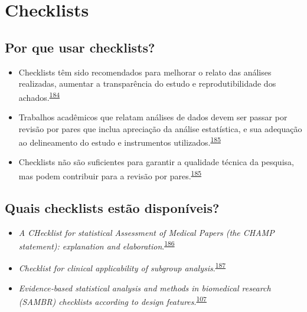 \documentclass[
]{book}
\begin{document}
\hypertarget{checklists}{%
\section{Checklists}\label{checklists}}

\hypertarget{por-que-usar-checklists}{%
\subsection{Por que usar checklists?}\label{por-que-usar-checklists}}

\begin{itemize}
\item
  Checklists têm sido recomendados para melhorar o relato das análises realizadas, aumentar a transparência do estudo e reprodutibilidade dos achados.\textsuperscript{\protect\hyperlink{ref-Gardner1986}{184}}
\item
  Trabalhos acadêmicos que relatam análises de dados devem ser passar por revisão por pares que inclua apreciação da análise estatística, e sua adequação ao delineamento do estudo e instrumentos utilizados.\textsuperscript{\protect\hyperlink{ref-Mascha2017}{185}}
\item
  Checklists não são suficientes para garantir a qualidade técnica da pesquisa, mas podem contribuir para a revisão por pares.\textsuperscript{\protect\hyperlink{ref-Mascha2017}{185}}
\end{itemize}

\hypertarget{quais-checklists-estuxe3o-disponuxedveis}{%
\subsection{Quais checklists estão disponíveis?}\label{quais-checklists-estuxe3o-disponuxedveis}}

\begin{itemize}
\item
  \emph{A CHecklist for statistical Assessment of Medical Papers (the CHAMP statement): explanation and elaboration}.\textsuperscript{\protect\hyperlink{ref-Mansournia2021}{186}}
\item
  \emph{Checklist for clinical applicability of subgroup analysis}.\textsuperscript{\protect\hyperlink{ref-Gil-Sierra2020}{187}}
\item
  \emph{Evidence‐based statistical analysis and methods in biomedical research (SAMBR) checklists according to design features}.\textsuperscript{\protect\hyperlink{ref-dwivedi2019}{107}}
\end{itemize}
\end{document}
